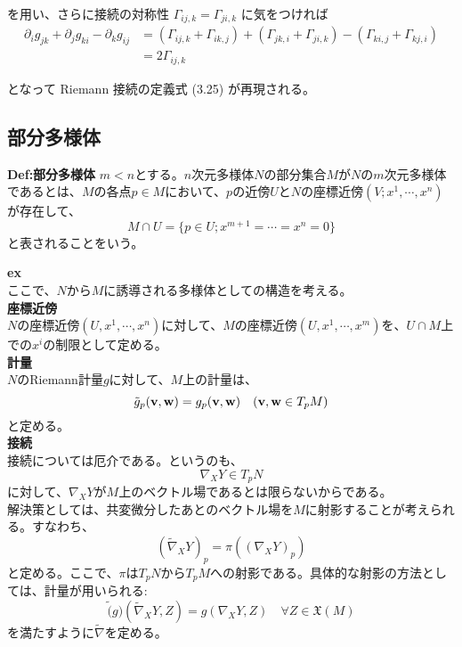 \documentclass[a4paper,11pt]{jsarticle}
\numberwithin{equation}{section}
\begin{document}
を用い、さらに接続の対称性 \(\Gamma_{ij,k} = \Gamma_{ji,k}\) に気をつければ
\begin{align}
    \partial_i g_{jk} + \partial_j g_{ki} - \partial_k g_{ij} &= (\Gamma_{ij,k} + \Gamma_{ik,j}) + (\Gamma_{jk,i} + \Gamma_{ji,k}) - (\Gamma_{ki,j} + \Gamma_{kj,i}) \\
    &= 2 \Gamma_{ij,k}
\end{align}

となって Riemann 接続の定義式 (3.25) が再現される。\hfill\qedsymbol

\subsection{部分多様体}
\begin{itembox}[l]{\textbf{Def:部分多様体}}
    $m<n$とする。$n$次元多様体$N$の部分集合$M$が$N$の$m$次元多様体であるとは、$M$の各点$p \in M$において、$p$の近傍$U$と$N$の座標近傍$(V;x^1,\cdots,x^n)$が存在して、
    \begin{equation}
        M \cap U = \{p \in U ; x^{m+1} = \cdots = x^n = 0\}
    \end{equation}
    と表されることをいう。
\end{itembox}
\textbf{ex}\\

ここで、$N$から$M$に誘導される多様体としての構造を考える。\\
\textbf{座標近傍}\\
$N$の座標近傍$(U,x^1,\cdots,x^n)$に対して、$M$の座標近傍$(U,x^1,\cdots,x^m)$を、$U \cap M$上での$x^i$の制限として定める。\\

\textbf{計量}\\
$N$のRiemann計量$g$に対して、$M$上の計量は、
\begin{equation}
    \tilde{g}_p(\vb{v},\vb{w}) = g_p(\vb{v},\vb{w}) \quad (\vb{v},\vb{w} \in T_pM)
\end{equation}
と定める。\\

\textbf{接続}\\
接続については厄介である。というのも、
\begin{equation}
    \nabla_X Y \in T_pN
\end{equation}
に対して、$\nabla_X Y$が$M$上のベクトル場であるとは限らないからである。\\
解決策としては、共変微分したあとのベクトル場を$M$に射影することが考えられる。すなわち、
\begin{equation}
    (\tilde{\nabla}_X Y)_p = \pi((\nabla_X Y)_p)
\end{equation}
と定める。ここで、$\pi$は$T_pN$から$T_pM$への射影である。具体的な射影の方法としては、計量が用いられる:
\begin{equation}
    \tilde(g)(\tilde{\nabla}_X Y, Z) = g(\nabla_X Y, Z) \quad \forall Z \in \mathfrak{X}(M)
\end{equation}
を満たすように$\tilde{\nabla}$を定める。%
\end{document}
